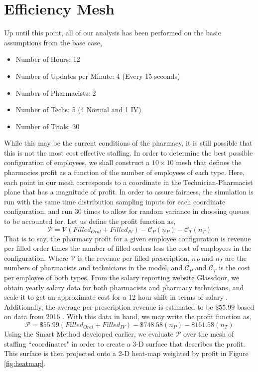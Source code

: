 \documentclass[10pt]{report}            %
\begin{document}
\section*{Efficiency Mesh}
Up until this point, all of our analysis has been performed on the basic assumptions from the base case,
\begin{itemize}
\item Number of Hours: 12
\item Number of Updates per Minute: 4 (Every 15 seconds)
\item Number of Pharmacists: 2
\item Number of Techs: 5 (4 Normal and 1 IV)
\item Number of Trials: 30
\end{itemize}
While this may be the current conditions of the pharmacy, it is still possible that this is not the most cost effective staffing. In order to determine the best possible configuration of employees, we shall construct a $10\times 10$ mesh that defines the pharmacies profit as a function of the number of employees of each type. Here, each point in our mesh corresponds to a coordinate in the Technician-Pharmacist plane that has a magnitude of profit. In order to assure fairness, the simulation is run with the same time distribution sampling inputs for each coordinate configuration, and run 30 times to allow for random variance in choosing queues to be accounted for. Let us define the profit function as,
\[\mathcal{P}=\mathcal{V}(Filled_{Oral}+Filled_{IV})-\mathcal{C}_{P}(n_{P})-\mathcal{C}_{T}(n_{T})\]
That is to say, the pharmacy profit for a given employee configuration is revenue per filled order times the number of filled orders less the cost of employees in the configuration. Where $\mathcal{V}$ is the revenue per filled prescription, $n_P$ and $n_T$ are the numbers of pharmacists and technicians in the model, and $\mathcal{C}_P$ and $\mathcal{C}_T$ is the cost per employee of both types.  From the salary reporting website Glassdoor, we obtain yearly salary data for both pharmacists and pharmacy technicians, and scale it to get an approximate cost for a 12 hour shift in terms of salary \cite{PSalary}\cite{TSalary}. Additionally, the average per-prescription revenue is estimated to be $\$55.99$ based on data from 2016 \cite{Revenue}. With this data in hand, we may write the profit function as,
\[\mathcal{P}=\$55.99(Filled_{Oral}+Filled_{IV})-\$748.58(n_{P})-\$161.58(n_{T})\]
Using the Smart Method developed earlier, we evaluate $\mathcal{P}$ over the mesh of staffing ``coordinates" in order to create a 3-D surface that describes the profit. This surface is then projected onto a 2-D heat-map weighted by profit in Figure \ref{fig:heatmap}.
\end{document}
